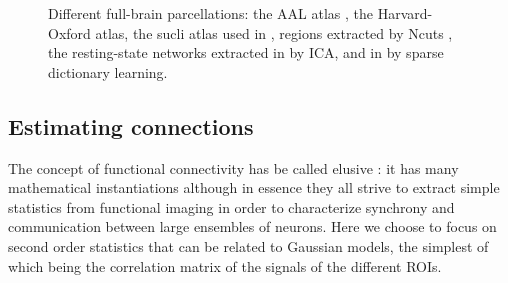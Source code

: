 \documentclass[5p]{elsarticle}
\begin{document}
\begin{figure}
\caption{
Different full-brain parcellations: the AAL atlas
\cite{tzourio-mazoyer2002a}, the Harvard-Oxford atlas, the sucli atlas used in
\cite{varoquaux2010c}, regions extracted by Ncuts
\cite{craddock2011}, the resting-state networks extracted in
\cite{smith2009} by ICA, and in \cite{varoquaux2011} by sparse dictionary
learning.
\label{fig:parcellations}
}
\end{figure}

\subsection{Estimating connections}

The concept of functional connectivity has be called elusive
\cite{horwitz2003}: it has many mathematical instantiations although in
essence they all strive to extract simple statistics from functional
imaging in order to characterize synchrony and communication between large
ensembles of neurons. Here we choose to focus on second order statistics
that can be related to Gaussian models, the simplest of which being the
correlation matrix of the signals of the different ROIs.
\end{document}
